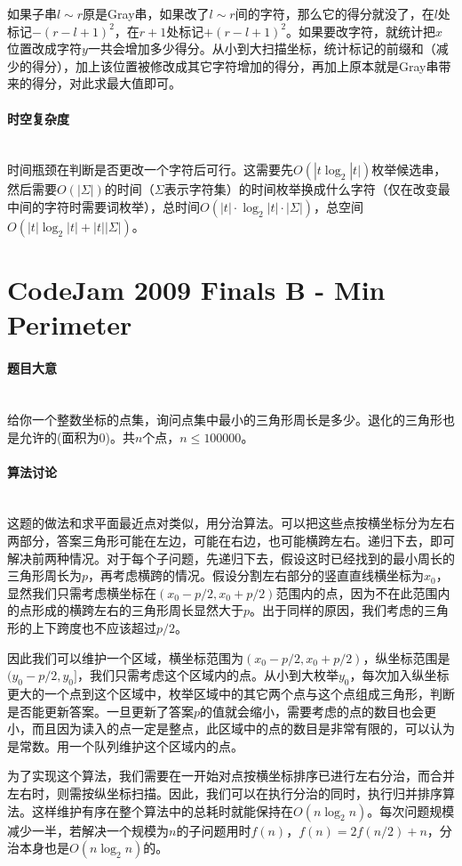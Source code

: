 \documentclass[UTF8]{ctexart}
\newcommand{\myparagraph}[1]{\paragraph{#1}\mbox{}\\}
\theoremstyle{nonumberplain}
\begin{document}
			如果子串$l \sim r$原是Gray串，如果改了$l \sim r$间的字符，那么它的得分就没了，在$l$处标记$-(r-l+1)^2$，在$r+1$处标记$+(r-l+1)^2$。如果要改字符，就统计把$x$位置改成字符$y$一共会增加多少得分。从小到大扫描坐标，统计标记的前缀和（减少的得分），加上该位置被修改成其它字符增加的得分，再加上原本就是Gray串带来的得分，对此求最大值即可。
		
		\myparagraph{时空复杂度}
		
			时间瓶颈在判断是否更改一个字符后可行。这需要先$O(|t\log_2|t|)$枚举候选串，然后需要$O(|\Sigma|)$的时间（$\Sigma$表示字符集）的时间枚举换成什么字符（仅在改变最中间的字符时需要词枚举），总时间$O(|t| \cdot \log_2|t| \cdot |\Sigma|)$，总空间$O(|t|\log_2|t|+|t||\Sigma|)$。
	
	\section{CodeJam 2009 Finals B - Min Perimeter}
	
		\myparagraph{题目大意}
		
			给你一个整数坐标的点集，询问点集中最小的三角形周长是多少。退化的三角形也是允许的(面积为0)。共$n$个点，$n \leq 100000$。
			
		\myparagraph{算法讨论}
		
			这题的做法和求平面最近点对类似，用分治算法。可以把这些点按横坐标分为左右两部分，答案三角形可能在左边，可能在右边，也可能横跨左右。递归下去，即可解决前两种情况。对于每个子问题，先递归下去，假设这时已经找到的最小周长的三角形周长为$p$，再考虑横跨的情况。假设分割左右部分的竖直直线横坐标为$x_0$，显然我们只需考虑横坐标在$(x_0-p/2,x_0+p/2)$范围内的点，因为不在此范围内的点形成的横跨左右的三角形周长显然大于$p$。出于同样的原因，我们考虑的三角形的上下跨度也不应该超过$p/2$。
			
			因此我们可以维护一个区域，横坐标范围为$(x_0-p/2,x_0+p/2)$，纵坐标范围是$(y_0-p/2,y_0]$，我们只需考虑这个区域内的点。从小到大枚举$y_0$，每次加入纵坐标更大的一个点到这个区域中，枚举区域中的其它两个点与这个点组成三角形，判断是否能更新答案。一旦更新了答案$p$的值就会缩小，需要考虑的点的数目也会更小，而且因为读入的点一定是整点，此区域中的点的数目是非常有限的，可以认为是常数。用一个队列维护这个区域内的点。
			
			为了实现这个算法，我们需要在一开始对点按横坐标排序已进行左右分治，而合并左右时，则需按纵坐标扫描。因此，我们可以在执行分治的同时，执行归并排序算法。这样维护有序在整个算法中的总耗时就能保持在$O(n\log_2n)$。每次问题规模减少一半，若解决一个规模为$n$的子问题用时$f(n)$，$f(n)=2f(n/2)+n$，分治本身也是$O(n\log_2n)$的。
			
\end{document}
